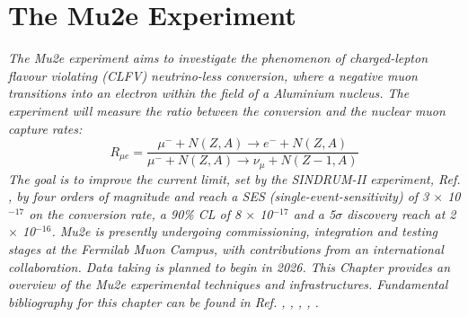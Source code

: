 \chapter{The Mu2e Experiment}\label{mu2echapter}
\textit{
The Mu2e experiment aims to investigate the phenomenon of charged-lepton flavour 
violating (CLFV) neutrino-less conversion, where a negative muon transitions into 
an electron within the field of a Aluminium nucleus. The experiment will measure 
the ratio between the conversion and the nuclear muon capture rates:
\begin{equation}\label{rmue}
R_{\mu e}=\frac{\mu^{-}+N(Z, A) \rightarrow e^{-}+N(Z, A)}{\mu^{-}+N(Z, A) \rightarrow \nu_\mu+N(Z-1, A)}
\end{equation}
The goal is to improve the current limit, set by the SINDRUM-II experiment, 
Ref. \cite{SINDRUMII:2006dvw}, by
four orders of magnitude and reach a SES (single-event-sensitivity) of 3 $\times$ 
10$^{-17}$ on the
conversion rate, a 90\% CL of 8 $\times$ 10$^{-17}$ and a 5$\sigma$ discovery 
reach at 2 $\times$ 10$^{-16}$.
Mu2e is presently undergoing commissioning, integration and testing stages at the 
Fermilab Muon Campus, 
with contributions from an international collaboration. Data taking is planned to 
begin in 2026. 
This Chapter provides an overview of the Mu2e experimental techniques and infrastructures. 
Fundamental bibliography for this chapter can be found in Ref. \cite{bartoszek2015mu2e}, 
\cite{bobbb}, \cite{Bernstein_2013}, \cite{Kargiantoulakis_2020}, \cite{universe9010054}.}
